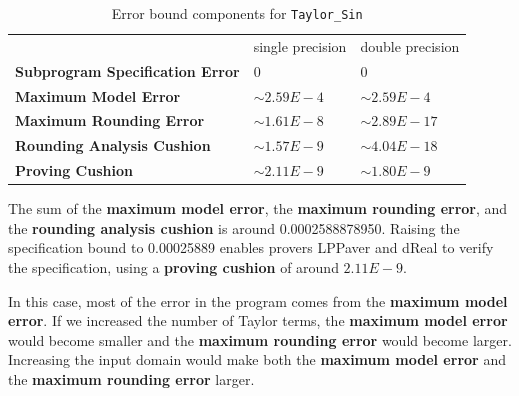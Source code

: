 \documentclass[runningheads]{llncs}
\begin{document}
\begin{table}[t]
  \begin{center}
    \begin{tabular}{l@{\kern 1em}l@{\kern 1em}l}
      \toprule
      & single precision & double precision \\
      \cmidrule(r){2-2}
      \cmidrule{3-3}
      \textbf{Subprogram Specification Error} & $0$  & $0$\\
      \textbf{Maximum Model Error}            & $\sim 2.59E{-}4$ & $\sim 2.59E{-}4$ \\
      \textbf{Maximum Rounding Error}         & $\sim 1.61E{-}8$ & $\sim 2.89E{-}17$ \\
      \textbf{Rounding Analysis Cushion}         & $\sim 1.57E{-}9$ & $\sim 4.04E{-}18$\\ %
      \textbf{Proving Cushion}       & $\sim 2.11E{-}9$ & $\sim 1.80E{-}9$\\
      \bottomrule
    \end{tabular}
  \end{center}
  \caption{Error bound components for \lstinline{Taylor_Sin}}\label{table:taylor-sine-components}
\end{table}

The sum of the \textbf{maximum model error}, the \textbf{maximum rounding error}, and the \textbf{rounding analysis cushion} %
is around 0.0002588878950.
Raising the specification bound to 0.00025889 enables provers LPPaver and dReal to verify the specification, using a \textbf{proving cushion} of around $2.11E{-}9$.


In this case, most of the error in the program comes from the \textbf{maximum model error}.
If we increased the number of Taylor terms, the \textbf{maximum model error} would become smaller and the \textbf{maximum rounding error} would become larger.
Increasing the input domain would make both the \textbf{maximum model error} and the \textbf{maximum rounding error} larger. 
\end{document}
